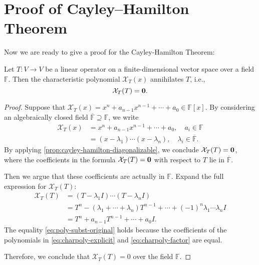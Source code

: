 \section{Proof of Cayley–Hamilton Theorem}
Now we are ready to give a proof for the Cayley-Hamilton Theorem:
\begin{theorem}\label{thm:cayley-hamilton-weaker}
Let \( T : V \to V \) be a linear operator on a finite-dimensional vector space over a field \( \mathbb{F} \). Then the characteristic polynomial \( \mathcal{X}_T(x) \) annihilates \( T \), i.e.,
\[
\mathcal{X}_T(T) = {\bf 0}.
\]
\end{theorem}

\begin{proof}
Suppose that \( \mathcal{X}_T(x) = x^n + a_{n - 1}x^{n - 1} + \cdots + a_0 \in \mathbb{F}[x] \). By considering an algebraically closed field \( \overline{\mathbb{F}} \supseteq \mathbb{F} \), we write
\begin{align}
\mathcal{X}_T(x) &= x^n + a_{n - 1}x^{n - 1} + \cdots + a_0, \quad a_i \in \mathbb{F} \label{eq:charpoly-explicit} \\
                 &= (x - \lambda_1)\cdots(x - \lambda_n), \quad \lambda_i \in \overline{\mathbb{F}}. \label{eq:charpoly-factor}
\end{align}
By applying \autoref{prop:cayley-hamilton-diagonalizable}, we conclude \( \mathcal{X}_T(T) = {\bf 0} \), where the coefficients in the formula \( \mathcal{X}_T(T) = {\bf 0} \) with respect to \( T \) lie in \( \overline{\mathbb{F}} \).

Then we argue that these coefficients are actually in \( \mathbb{F} \). Expand the full expression for \( \mathcal{X}_T(T) \):
\begin{align}
\mathcal{X}_T(T) &= (T - \lambda_1 I)\cdots(T - \lambda_n I) \label{eq:poly-subst-product} \\
                 &= T^n - (\lambda_1 + \cdots + \lambda_n) T^{n-1} + \cdots + (-1)^n \lambda_1 \cdots \lambda_n I \label{eq:poly-subst-expanded} \\
                 &= T^n + a_{n - 1} T^{n - 1} + \cdots + a_0 I. \label{eq:poly-subst-original}
\end{align}
The equality \eqref{eq:poly-subst-original} holds because the coefficients of the polynomials in \eqref{eq:charpoly-explicit} and \eqref{eq:charpoly-factor} are equal.

Therefore, we conclude that \( \mathcal{X}_T(T) = 0 \) over the field \( \mathbb{F} \).
\end{proof}

